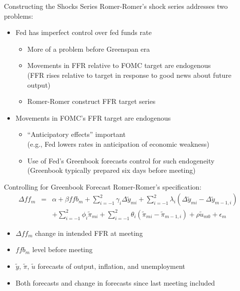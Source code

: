 \documentclass[11pt,aspectratio=169,xcolor={dvipsnames},hyperref={pdftex,pdfpagemode=UseNone,hidelinks,pdfdisplaydoctitle=true},usepdftitle=false]{beamer}
\begin{document}
\begin{frame}{Constructing the Shocks Series}
Romer-Romer's shock series addresses two problems:
\begin{itemize}
\item Fed has imperfect control over fed funds rate
\begin{itemize}
\item More of a problem before Greenspan era
\item Movements in FFR relative to FOMC target are endogenous \\ (FFR rises relative to target in response to good news about future output)
\item Romer-Romer construct FFR target series
\end{itemize} \pause
\item Movements in FOMC's FFR target are endogenous 
\begin{itemize}
\item ``Anticipatory effects'' important \\(e.g., Fed lowers rates in anticipation of economic weakness)
\item Use of Fed's Greenbook forecasts control for such endogeneity \\ (Greenbook typically prepared six days before meeting)
\end{itemize}
\end{itemize}
\end{frame}

\begin{frame}{Controlling for Greenbook Forecast}
Romer-Romer's specification:
\begin{eqnarray*} 
\Delta ff_{m} & = & \alpha + \beta ffb_{m} + \sum_{i=-1}^{2} \gamma_{i} \Delta \tilde{y}_{mi} + \sum_{i=-1}^{2} \lambda_{i} (\Delta \tilde{y}_{mi}-\Delta \tilde{y}_{m-1,i}) \\ 
 & & + \sum_{i=-1}^{2} \phi_{i} \tilde{\pi}_{mi} + \sum_{i=-1}^{2} \theta_{i} (\tilde{\pi}_{mi} - \tilde{\pi}_{m-1,i}) + \rho \tilde{u}_{m0} + \epsilon_{m} 
\end{eqnarray*}
\begin{itemize}
\item $\Delta ff_{m}$ change in intended FFR at meeting
\item $ffb_{m}$ level before meeting 
\item $\tilde{y}$, $\tilde{\pi}$, $\tilde{u}$ forecasts of output, inflation, and unemployment
\item Both forecasts and change in forecasts since last meeting included
\end{itemize}
\end{frame}
\end{document}

